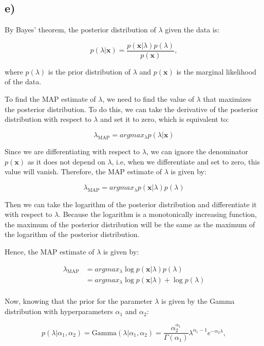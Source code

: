 \documentclass[12pt,a4paper,oneside]{paper}
\begin{document}
\newpage
\subsection*{e)}

By Bayes' theorem, the posterior distribution of \( \lambda \) given the data is:

\[
p(\lambda | \bm{x}) = \frac{p(\bm{x} | \lambda) p(\lambda)}{p(\bm{x})},
\]

where \( p(\lambda) \) is the prior distribution of \( \lambda \) and \( p(\bm{x}) \) is the marginal likelihood of the data.

To find the MAP estimate of \( \lambda \), we need to find the value of \( \lambda \) that maximizes the posterior distribution. To do this, we can take the derivative of the posterior distribution with respect to \( \lambda \) and set it to zero, 
which is equivalent to:

\[
\lambda_{\text{MAP}} = argmax_{\lambda} p(\lambda | \bm{x})
\]

Since we are differentiating with respect to \( \lambda \), we can ignore the denominator \( p(\bm{x}) \) as it does not depend on \( \lambda \), i.e, when we differentiate and set to zero, this value will vanish. Therefore, the MAP estimate of \( \lambda \) is given by:

\[
\lambda_{\text{MAP}} = argmax_{\lambda} p(\mathbf{x} | \lambda) p(\lambda)
\]

Then we can take the logarithm of the posterior distribution and differentiate it with respect to \( \lambda \). Because the logarithm is a monotonically increasing function, the maximum of the posterior distribution will be the same as the maximum of the logarithm of the posterior distribution.

Hence, the MAP estimate of \( \lambda \) is given by:

\begin{align*}
\lambda_{\text{MAP}} &= argmax_{\lambda} \log p(\bm{x} | \lambda) p(\lambda) \\
&= argmax_{\lambda} \log p(\mathbf{x} | \lambda) + \log p(\lambda) \\
\end{align*}

Now, knowing that the prior for the parameter \( \lambda \) is given by the Gamma distribution with hyperparameters \( \alpha_1 \) and \( \alpha_2 \):

\[
p(\lambda | \alpha_1, \alpha_2) = \text{Gamma}(\lambda | \alpha_1, \alpha_2) = \frac{\alpha_2^{\alpha_1}}{\Gamma(\alpha_1)} \lambda^{\alpha_1 - 1} e^{-\alpha_2 \lambda},
\]
\end{document}
